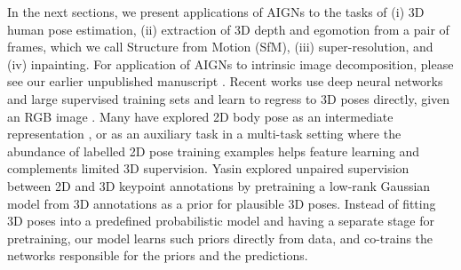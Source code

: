 \documentclass[10pt,twocolumn,letterpaper]{article}
\begin{document}
\begin{bibunit}[ieee]
In the next sections, we present applications of AIGNs to the tasks of (i) 3D human pose estimation, (ii) extraction of 3D depth and egomotion from a pair of frames, which we call Structure from Motion (SfM),  (iii) super-resolution, and  (iv) inpainting. 
For  application of AIGNs to intrinsic image decomposition, please see our earlier unpublished manuscript \cite{inversionearlier}. 
Recent works use deep neural networks and large supervised training sets \cite{h36m_pami} and learn to regress to 3D poses directly, given an RGB image \cite{DBLP:journals/corr/PavlakosZDD16}. Many have explored 2D body pose as an intermediate representation \cite{DBLP:journals/corr/ChenR16a,Wu2016,DBLP:journals/corr/TomeRA17}, or as an  auxiliary task in a multi-task setting \cite{DBLP:journals/corr/TomeRA17} where the abundance of labelled 2D pose training examples helps feature learning and complements limited 3D supervision. Yasin \etal\cite{Yasin_Iqbal_CVPR2016} explored unpaired supervision between 2D and 3D keypoint annotations by pretraining a low-rank Gaussian model from 3D annotations as a prior for plausible 3D poses. Instead of fitting 3D poses into a predefined probabilistic model and having a separate stage for pretraining, our model learns such priors directly from data, and co-trains the networks responsible for the priors and the predictions.



\end{bibunit}
\end{document}
